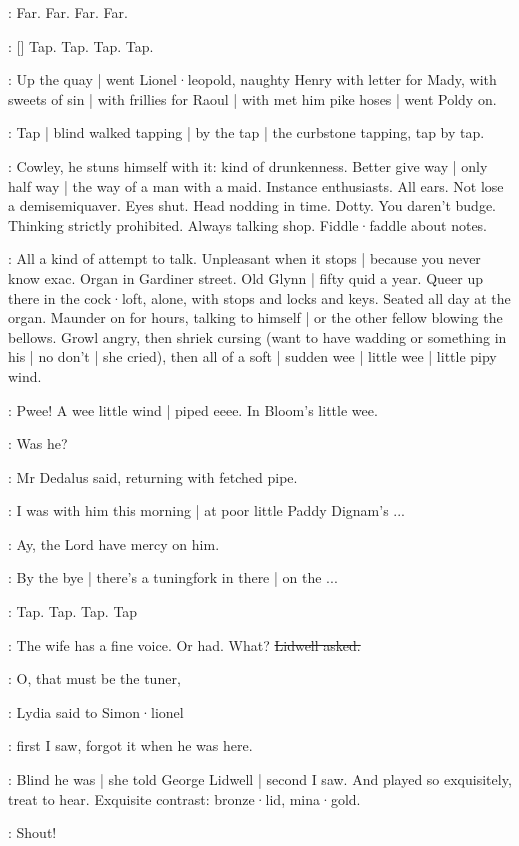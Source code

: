 :
Far.
Far.
Far.
Far.

\stripling:
[]
Tap.
Tap.
Tap.
Tap.

:
Up the quay |
went Lionel·leopold,
naughty Henry with letter for Mady,
with sweets of sin |
with frillies for Raoul |
with met him pike hoses |
went Poldy on.

:
Tap |
blind walked
tapping |
by the tap |
the curbstone tapping,
tap by tap.

\BloomInt:
Cowley,
he stuns himself with it:
kind of drunkenness.
Better give way |
only half way |
the way of a man with a maid.
Instance enthusiasts.
All ears.
Not lose a demisemiquaver.
Eyes shut.
Head nodding in time.
Dotty.
You daren't budge.
Thinking strictly prohibited.
Always talking shop.
Fiddle·faddle about notes.

\BloomInt:
All a kind of attempt to talk.
Unpleasant when it stops |
because you never know exac.
Organ in Gardiner street.
Old Glynn |
fifty quid a year.
Queer up there in the cock·loft,
alone,
with stops and locks and keys.
Seated all day at the organ.
Maunder on for hours,
talking to himself |
or the other fellow blowing the bellows.
Growl angry,
then shriek cursing
(want to have wadding or something in his |
no don't |
she cried),
then all of a soft |
sudden wee |
little wee |
little pipy wind.

:
Pwee!
A wee little wind |
piped eeee.
In Bloom's little wee.

\simon:
Was he?

:
Mr Dedalus said,
returning with fetched pipe.

\simon:
I was with him this morning |
at poor little Paddy Dignam's ...

\lidwell:
Ay,
the Lord have mercy on him.

\simon:
By the bye |
there's a tuningfork in there |
on the ...

\stripling:
Tap.
Tap.
Tap.
Tap

\lidwell:
The wife has a fine voice.
Or had.
What?
\sout{Lidwell asked.}

\MissD:
O,
that must be the tuner,

:
Lydia said to Simon·lionel

\MissD:
first I saw,
forgot it when he was here.

:
Blind he was |
she told George Lidwell |
second I saw.
And played so exquisitely,
treat to hear.
Exquisite contrast:
bronze·lid,
mina·gold.

\dollard:
Shout!

